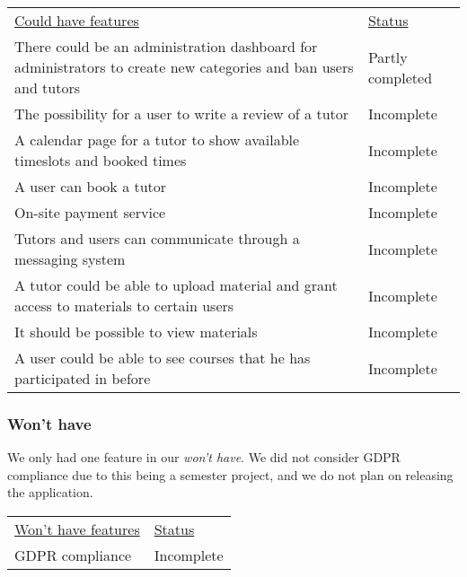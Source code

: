 \begin{table}[H]
    \begin{tabularx}{\textwidth}{|X|l|}
    \underline{Could have features}                                                                                  & \underline{Status} \\
    There could be an administration dashboard for administrators to create new categories and ban users and tutors   & Partly completed \\
    The possibility for a user to write a review of a tutor                                                           & Incomplete \\
    A calendar page for a tutor to show available timeslots and booked times                                          & Incomplete \\
    A user can book a tutor                                                                                           & Incomplete \\
    On-site payment service                                                                                           & Incomplete \\
    Tutors and users can communicate through a messaging system                                                       & Incomplete \\
    A tutor could be able to upload material and grant access to materials to certain users                           & Incomplete \\
    It should be possible to view materials                                                                           & Incomplete \\
    A user could be able to see courses that he has participated in before                                            & Incomplete \\
\end{tabularx}
\end{table}

\subsubsection{Won't have}
We only had one feature in our \textit{won't have}. 
We did not consider GDPR compliance due to this being a semester project, and we do not plan on releasing the application.
\begin{table}[H]
    \begin{tabularx}{\textwidth}{|X|l|}
    \underline{Won't have features}                    & \underline{Status} \\
    GDPR compliance                                     & Incomplete \\
   \end{tabularx}
\end{table}
